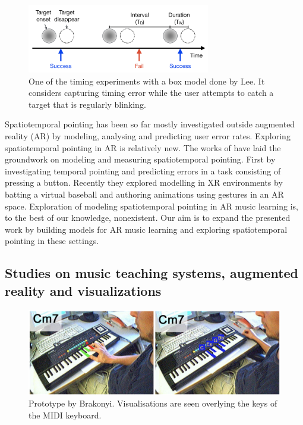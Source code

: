 \documentclass[manuscript,screen]{acmart}
\begin{document}
\begin{figure}[t]
\centering
 \includegraphics[width=8cm]{figures/boxmodel.png}
    \caption{One of the timing experiments with a box model done by Lee. It considers capturing timing error while the user attempts to catch a target that is regularly blinking.
    }\label{fig:boxmodel}
\end{figure}

Spatiotemporal pointing has been so far mostly investigated outside augmented reality (AR) by modeling, analysing and predicting user error rates. Exploring spatiotemporal pointing in AR is relatively new. The works of \citet{liao2020button, lee2019geometrically, arora2019magicalhands} have laid the groundwork on modeling and measuring spatiotemporal pointing. First by investigating temporal pointing and predicting errors in a task consisting of pressing a button. Recently they explored modelling in XR environments by batting a virtual baseball and authoring animations using gestures in an AR space. Exploration of modeling spatiotemporal pointing in AR music learning is, to the best of our knowledge, nonexistent. Our aim is to expand the presented work by building models for AR music learning and exploring spatiotemporal pointing in these settings. 

\subsection{Studies on music teaching systems, augmented reality and visualizations}

\begin{figure}[h]
\centering
 \includegraphics[width=12cm]{figures/barakonyi.png}
    \caption{Prototype by Brakonyi. Visualisations are seen overlying the keys of the MIDI keyboard.
    }\label{fig:barakonyi}
\end{figure}
\end{document}
